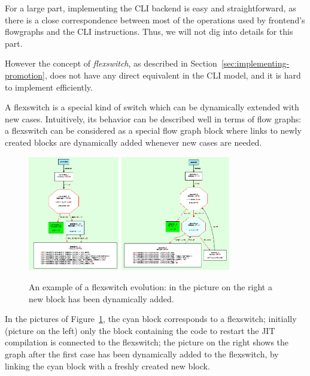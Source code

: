For a large part, implementing the CLI backend is easy and straightforward, as
there is a close correspondence between most of the operations used by
frontend's flowgraphs and the CLI instructions.  Thus, we will not dig into
details for this part.

However the concept of \emph{flexswitch}, as described in
Section~\ref{sec:implementing-promotion}, does not have any direct equivalent
in the CLI model, and it is hard to implement efficiently.

A flexswitch is a special kind of switch which can be dynamically
extended with new cases.  Intuitively, its behavior can be described
well in terms of flow graphs: a flexswitch can be considered 
as a special flow graph block where links to newly created blocks are
dynamically added whenever new cases are needed. 

\begin{figure}[h]
\begin{center}
\includegraphics[height=5cm]{flexswitch1}
\includegraphics[height=5cm]{flexswitch2}
\caption{An example of a flexswitch evolution: in the picture on the
  right a new block has been dynamically added.}\label{flexswitch-fig}
\end{center}
\end{figure}

In the pictures of Figure~\ref{flexswitch-fig}, the cyan block
corresponds to a flexswitch; initially (picture on the left) 
only the block containing the code to restart the JIT compilation
is connected to the flexswitch; the picture on the right
shows the graph after the first case has been dynamically added to the flexswitch,
by linking the cyan block with a freshly created new block.


